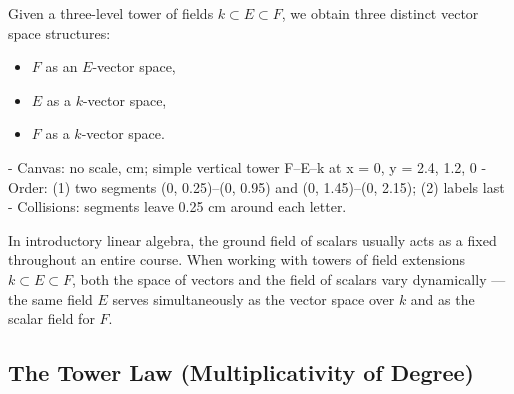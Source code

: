 \begin{content}
Given a three-level tower of fields $k \subset E \subset F$, we obtain three distinct vector space structures:
\begin{itemize}
    \item $F$ as an $E$-vector space,
    \item $E$ as a $k$-vector space,
    \item $F$ as a $k$-vector space.
\end{itemize}

\begin{hidden}
- Canvas: no scale, cm; simple vertical tower F--E--k at x = 0, y = 2.4, 1.2, 0
- Order: (1) two segments (0, 0.25)--(0, 0.95) and (0, 1.45)--(0, 2.15); (2) labels last
- Collisions: segments leave 0.25 cm around each letter.
\end{hidden}
\begin{center}
\end{center}
\end{content}

\begin{insight}
In introductory linear algebra, the ground field of scalars usually acts as a fixed  throughout an entire course. When working with towers of field extensions $k \subset E \subset F$, both the space of vectors and the field of scalars vary dynamically --- the same field $E$ serves simultaneously as the vector space over $k$ and as the scalar field for $F$.
\end{insight}

\subsection{The Tower Law (Multiplicativity of Degree)}

